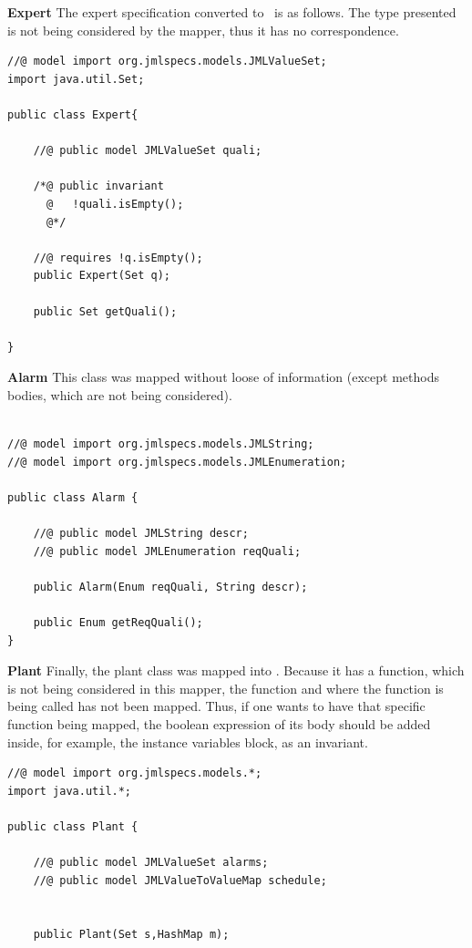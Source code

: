 \begin{description}
\item{\textbf{Expert}} The expert specification converted to \jml\ is as follows. The type presented is not being considered by the mapper, thus it has no correspondence.
\lstset{language=Java}
\lstset{style=JML}
\begin{lstlisting}
//@ model import org.jmlspecs.models.JMLValueSet;
import java.util.Set;

public class Expert{

	//@ public model JMLValueSet quali;
	
	/*@ public invariant
	  @   !quali.isEmpty();
	  @*/

	//@ requires !q.isEmpty();
	public Expert(Set q);
	
	public Set getQuali();

}
\end{lstlisting}

\item{\textbf{Alarm}} This class was mapped without loose of information (except methods bodies, which are not being considered).
\begin{lstlisting}

//@ model import org.jmlspecs.models.JMLString;
//@ model import org.jmlspecs.models.JMLEnumeration;

public class Alarm {

	//@ public model JMLString descr;
	//@ public model JMLEnumeration reqQuali;
	
	public Alarm(Enum reqQuali, String descr);
	
	public Enum getReqQuali();
}
\end{lstlisting}

\item{\textbf{Plant}} Finally, the plant class was mapped into \jml. Because it has a function, which is not being considered in this mapper, the function and where the function is being called has not been mapped. Thus, if one wants to have that specific function being mapped, the boolean expression of its body should be added inside, for example, the instance variables block, as an invariant.
\begin{lstlisting}
//@ model import org.jmlspecs.models.*;
import java.util.*;

public class Plant {

    //@ public model JMLValueSet alarms;
	//@ public model JMLValueToValueMap schedule;
	
	
	public Plant(Set s,HashMap m);
	

\end{lstlisting}
\end{description}
